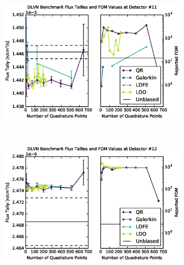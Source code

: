 \begin{figure}[!htb]
\ContinuedFloat
\begin{subfigure}{\linewidth}
\centering
\includegraphics[max height=0.445\textheight]
{img/dlvn-plots/mcnp/fwc-11.eps}
\label{dlvn-fwc-11}
\end{subfigure}
\\
\begin{subfigure}{\linewidth}
\centering
\includegraphics[max height=0.445\textheight]
{img/dlvn-plots/mcnp/fwc-12.eps}
\label{dlvn-fwc-12}
\end{subfigure}
\end{figure}
\clearpage
